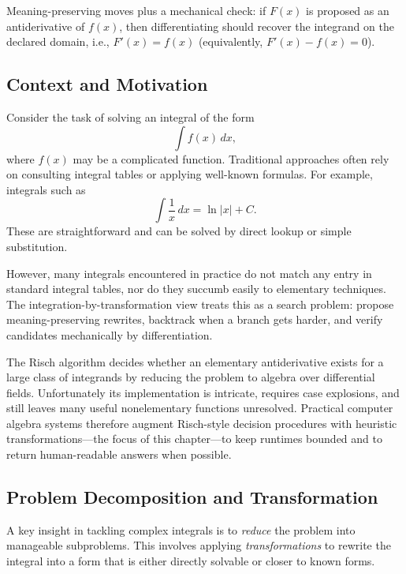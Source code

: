 \begin{tcolorbox}[summarybox, title={Design motif}]
Meaning\hyp{}preserving moves plus a mechanical check: if \(F(x)\) is proposed as an antiderivative of \(f(x)\), then differentiating should recover the integrand on the declared domain, i.e., \(F'(x)=f(x)\) (equivalently, \(F'(x)-f(x)=0\)).
\end{tcolorbox}

\subsection{Context and Motivation}
\label{sec:symbolic_context_and_motivation}

Consider the task of solving an integral of the form
\[
\int f(x) \, dx,
\]
where \( f(x) \) may be a complicated function. Traditional approaches often rely on consulting integral tables or applying well-known formulas. For example, integrals such as
\[
\int \frac{1}{x} \, dx = \ln|x| + C.
\]
These are straightforward and can be solved by direct lookup or simple substitution.

However, many integrals encountered in practice do not match any entry in standard integral tables, nor do they succumb easily to elementary techniques. The integration-by-transformation view treats this as a search problem: propose meaning-preserving rewrites, backtrack when a branch gets harder, and verify candidates mechanically by differentiation.

\begin{tcolorbox}[summarybox, title={Aside: the Risch algorithm}]
The Risch algorithm \citep{Risch1969} decides whether an elementary antiderivative exists for a large class of integrands by reducing the problem to algebra over differential fields. Unfortunately its implementation is intricate, requires case explosions, and still leaves many useful nonelementary functions unresolved. Practical computer algebra systems therefore augment Risch-style decision procedures with heuristic transformations---the focus of this chapter---to keep runtimes bounded and to return human-readable answers when possible.
\end{tcolorbox}

\subsection{Problem Decomposition and Transformation}
\label{sec:symbolic_problem_decomposition_and_transformation}

A key insight in tackling complex integrals is to \emph{reduce} the problem into manageable subproblems. This involves applying \emph{transformations} to rewrite the integral into a form that is either directly solvable or closer to known forms.

